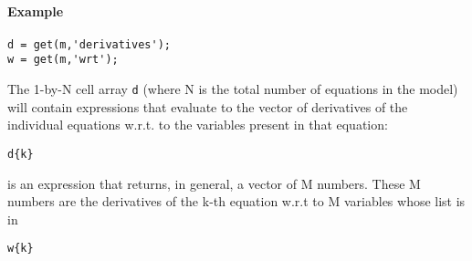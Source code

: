 \paragraph{Example}

\begin{verbatim}
d = get(m,'derivatives');
w = get(m,'wrt');
\end{verbatim}

The 1-by-N cell array \texttt{d} (where N is the total number of
equations in the model) will contain expressions that evaluate to the
vector of derivatives of the individual equations w.r.t. to the
variables present in that equation:

\begin{verbatim}
d{k}
\end{verbatim}

is an expression that returns, in general, a vector of M numbers. These
M numbers are the derivatives of the k-th equation w.r.t to M variables
whose list is in

\begin{verbatim}
w{k}
\end{verbatim}



